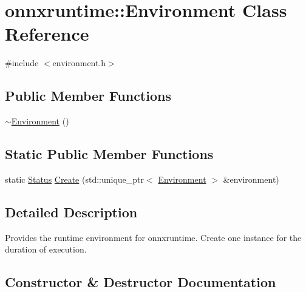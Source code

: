 \hypertarget{classonnxruntime_1_1Environment}{}\section{onnxruntime\+:\+:Environment Class Reference}
\label{classonnxruntime_1_1Environment}


{\ttfamily \#include $<$environment.\+h$>$}

\subsection*{Public Member Functions}
\begin{DoxyCompactItemize}
\item 
\mbox{\hyperlink{classonnxruntime_1_1Environment_ab59b65980fbca4d8511596c5fb246360}{$\sim$\+Environment}} ()
\end{DoxyCompactItemize}
\subsection*{Static Public Member Functions}
\begin{DoxyCompactItemize}
\item 
static \mbox{\hyperlink{classonnxruntime_1_1common_1_1Status}{Status}} \mbox{\hyperlink{classonnxruntime_1_1Environment_a27156c3c3c75745309a93a5fa9713942}{Create}} (std\+::unique\+\_\+ptr$<$ \mbox{\hyperlink{classonnxruntime_1_1Environment}{Environment}} $>$ \&environment)
\end{DoxyCompactItemize}


\subsection{Detailed Description}
Provides the runtime environment for onnxruntime. Create one instance for the duration of execution. 

\subsection{Constructor \& Destructor Documentation}
\mbox{\label{classonnxruntime_1_1Environment_ab59b65980fbca4d8511596c5fb246360}} 

